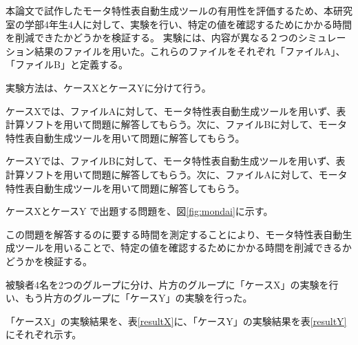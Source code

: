 本論文で試作したモータ特性表自動生成ツールの有用性を評価するため、本研究室の学部4年生4人に対して、実験を行い、特定の値を確認するためにかかる時間を削減できたかどうかを検証する。
実験には、内容が異なる２つのシミュレーション結果のファイルを用いた。これらのファイルをそれぞれ「ファイルA」、「ファイルB」と定義する。

実験方法は、ケースXとケースYに分けて行う。

ケースXでは、ファイルAに対して、モータ特性表自動生成ツールを用いず、表計算ソフトを用いて問題に解答してもらう。次に、ファイルBに対して、モータ特性表自動生成ツールを用いて問題に解答してもらう。

ケースYでは、ファイルBに対して、モータ特性表自動生成ツールを用いず、表計算ソフトを用いて問題に解答してもらう。次に、ファイルAに対して、モータ特性表自動生成ツールを用いて問題に解答してもらう。

ケースXとケースY で出題する問題を、図\ref{fig:mondai}に示す。

この問題を解答するのに要する時間を測定することにより、モータ特性表自動生成ツールを用いることで、特定の値を確認するためにかかる時間を削減できるかどうかを検証する。

被験者4名を2つのグループに分け、片方のグループに「ケースX」の実験を行い、もう片方のグループに「ケースY」の実験を行った。

「ケースX」の実験結果を、表\ref{resultX}に、「ケースY」の実験結果を表\ref{resultY}にそれぞれ示す。


